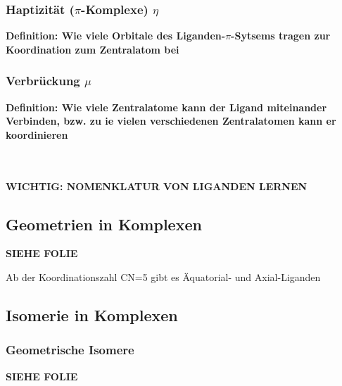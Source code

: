 \documentclass{article}
\begin{document}
\subsubsection{Haptizität ($\pi$-Komplexe) $\eta$}
\textbf{Definition: Wie viele Orbitale des Liganden-$\pi$-Sytsems tragen zur Koordination zum Zentralatom bei}

\subsubsection{Verbrückung $\mu$}
\textbf{Definition: Wie viele Zentralatome kann der Ligand miteinander Verbinden, bzw. zu ie vielen verschiedenen Zentralatomen kann er koordinieren}
\\\\\\
\begin{center}
    \textbf{WICHTIG: NOMENKLATUR VON LIGANDEN LERNEN}
\end{center}
\subsection{Geometrien in Komplexen}
\begin{center}
    \textbf{SIEHE FOLIE}
\end{center}
Ab der Koordinationszahl CN=5 gibt es Äquatorial- und Axial-Liganden

\subsection{Isomerie in Komplexen}
\subsubsection{Geometrische Isomere}
\begin{center}
    \textbf{SIEHE FOLIE}
\end{center}
\end{document}
